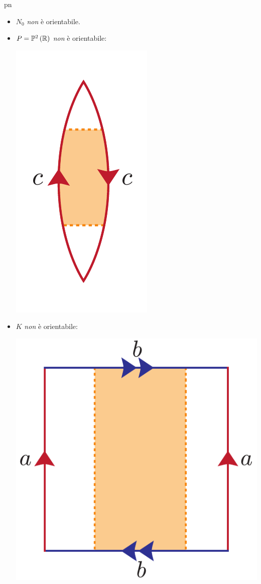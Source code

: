 \begin{example}{pn}~{}
	\begin{itemize}
		\item $N_0$ \textit{non} è orientabile.
		\item $P=\mathbb{P}^2\left(\mathbb{R}\right)$ \textit{non} è orientabile:
		\begin{center}
			\includegraphics[trim=0cm 0cm 0cm 0cm, clip, scale=0.35]{images/projmoebius.pdf}
		\end{center}
		\item $K$ \textit{non} è orientabile:
		\begin{center}
			\includegraphics[trim=0cm 0cm 0cm 0cm, clip, scale=0.35]{images/kleinmoebius.pdf}

\end{center}
\end{itemize}
\end{example}
